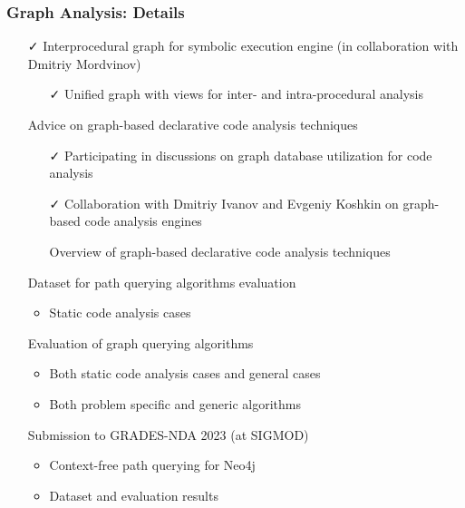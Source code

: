 \documentclass[xcolor=table,aspectratio=169]{beamer}
\begin{document}
\begin{frame}[fragile]
  \frametitle{Graph Analysis: Details} 
  \begin{itemize}
    \item[\faCheck] Interprocedural graph for symbolic execution engine (in collaboration with Dmitriy Mordvinov)
    \begin{itemize}
      \item[\faCheck] Unified graph with views for inter- and intra-procedural analysis
    \end{itemize}
    \pause
    \item[\faGears] Advice on graph-based declarative code analysis techniques
    \begin{itemize}
      \item[\faCheck] Participating in discussions on graph database utilization for code analysis
      \item[\faCheck] Collaboration with Dmitriy Ivanov and Evgeniy Koshkin on graph-based code analysis engines
      \item[\faGears] Overview of graph-based declarative code analysis techniques 
    \end{itemize}
    \pause
    \item[\faGears] Dataset for path querying algorithms evaluation
    \begin{itemize}
      \item Static code analysis cases
    \end{itemize} 
    \item[\faGears] Evaluation of graph querying algorithms
    \begin{itemize}
      \item Both static code analysis cases and general cases
      \item Both problem specific and generic algorithms
    \end{itemize} 
    \pause
    \item[\faGears] Submission to GRADES-NDA 2023 (at SIGMOD)
    \begin{itemize}
      \item Context-free path querying for Neo4j
      \item Dataset and evaluation results
    \end{itemize}
    \end{itemize}
\end{frame}
\end{document}
